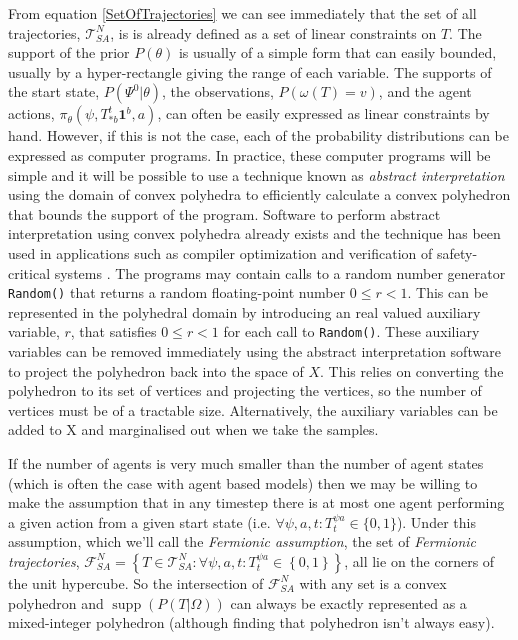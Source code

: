 \documentclass{article}
\DeclareMathOperator\supp{supp}
\begin{document}
From equation \ref{SetOfTrajectories} we can see immediately that the set of all trajectories, $\mathcal{T}^N_{SA}$, is is already defined as a set of linear constraints on $T$. The support of the prior $P(\theta)$ is usually of a simple form that can easily bounded, usually by a hyper-rectangle giving the range of each variable. The supports of the start state, $P(\Psi^0|\theta)$, the observations, $P(\omega(T)=v)$, and the agent actions, $\pi_\theta(\psi,T^t_{*b}\mathbf{1}^b,a)$, can often be easily expressed as linear constraints by hand. However, if this is not the case, each of the probability distributions can be expressed as computer programs. In practice, these computer programs will be simple and it will be possible to use a technique known as \textit{abstract interpretation} \citep{cousot1977abstract} using the domain of convex polyhedra \citep*{cousot1978automatic, becchi2018efficient, fukuda2020polyhedral} to efficiently calculate a convex polyhedron that bounds the support of the program. Software to perform abstract interpretation using convex polyhedra already exists \citep*{henry2012pagai, GN2021, jeannet2009apron, bagnara2008parma} and the technique has been used in applications such as compiler optimization \citep{nsjodin2009design} and verification of safety-critical systems \citep{halbwachs1997verification}. The programs may contain calls to a random number generator \texttt{Random()} that returns a random floating-point number $0 \le r < 1$. This can be represented in the polyhedral domain by introducing an real valued auxiliary variable, $r$, that satisfies $0 \le r < 1$ for each call to \texttt{Random()}. These auxiliary variables can be removed immediately using the abstract interpretation software to project the polyhedron back into the space of $X$. This relies on converting the polyhedron to its set of vertices \citep{motzkin1953double} and projecting the vertices, so the number of vertices must be of a tractable size. Alternatively, the auxiliary variables can be added to X and marginalised out when we take the samples.

If the number of agents is very much smaller than the number of agent states (which is often the case with agent based models) then we may be willing to make the assumption that in any timestep there is at most one agent performing a given action from a given start state (i.e. $\forall \psi, a, t: T^{\psi a}_t \in \{0,1\}$). Under this assumption, which we'll call the \textit{Fermionic assumption}, the set of \textit{Fermionic trajectories}, $\mathcal{F}^N_{SA} = \left\{T\in\mathcal{T}^N_{SA}: \forall \psi, a, t: T^{\psi a}_t \in \left\{0,1\right\}\right\}$, all lie on the corners of the unit hypercube. So the intersection of $\mathcal{F}^N_{SA}$ with any set is a convex polyhedron and $\supp(P(T|\Omega))$ can always be exactly represented as a mixed-integer polyhedron (although finding that polyhedron isn't always easy).
\end{document}

